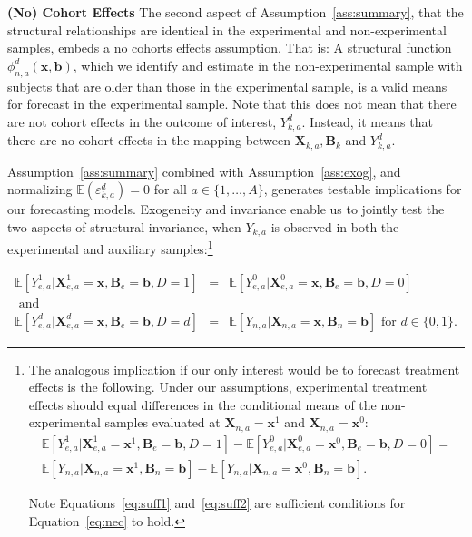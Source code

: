 \begin{remark} \label{remark:cohort} \textbf{(No) Cohort Effects}
The second aspect of Assumption~\ref{ass:summary}, that the structural relationships are identical in the experimental and non-experimental samples, embeds a no cohorts effects assumption. That is: A structural function $\phi_{n,a}^d \left( \bm{x}, \bm{b} \right)$, which we identify and estimate in the non-experimental sample with subjects that are older than those in the experimental sample, is a valid means for forecast in the experimental sample. Note that this does not mean that there are not cohort effects in the outcome of interest, $Y_{k,a}^d$. Instead, it means that there are no cohort effects in the mapping between $\bm{X}_{k,a}, \bm{B}_k$ and $Y_{k,a}^d$. 
\end{remark}
\doublespacing

Assumption~\ref{ass:summary} combined with Assumption~\ref{ass:exog}, and normalizing $\mathbb{E}(\varepsilon^d_{k,a})=0$ for all $a \in \{1,\dots,A\}$, generates testable implications for our forecasting models. Exogeneity and invariance enable us to jointly test the two aspects of structural invariance, when $Y_{k,a}$ is observed in both the experimental and auxiliary samples:\footnote{The analogous implication if our only interest would be to forecast treatment effects is the following. Under our assumptions, experimental treatment effects should equal differences in the conditional means of the non-experimental samples evaluated at $\bm{X}_{n,a} = \bm{x}^1$ and  $\bm{X}_{n,a} = \bm{x}^0$:
\begin{eqnarray}
\mathbb{E} \left[ Y_{e,a}^1 |  \bm{X}_{e,a}^1 = \bm{x}^1, \bm{B}_e = \bm{b}, D = 1 \right] - \mathbb{E} \left[ Y_{e,a}^0 |  \bm{X}_{e,a}^0 = \bm{x}^0, \bm{B}_e = \bm{b}, D = 0 \right] = \nonumber \\
\mathbb{E} \left[ Y_{n,a} | \bm{X}_{n,a} = \bm{x}^1, \bm{B}_n = \bm{b} \right] - \mathbb{E} \left[ Y_{n,a} | \bm{X}_{n,a} = \bm{x}^0, \bm{B}_n = \bm{b} \right]. \label{eq:nec}
\end{eqnarray}

Note Equations~\eqref{eq:suff1} and~\eqref{eq:suff2} are sufficient conditions for Equation~\eqref{eq:nec} to hold.}

\begin{eqnarray}
\mathbb{E} \left[ Y_{e,a}^1 | \bm{X}_{e,a}^1 = \bm{x}, \bm{B}_{e} = \bm{b}, D = 1   \right] &=&  \mathbb{E} \left[ Y_{e,a}^0 | \bm{X}_{e,a}^0 = \bm{x}, \bm{B}_{e} = \bm{b}, D = 0   \right] \label{eq:suff1}  \\
\text{ and} & \nonumber \\
\mathbb{E} \left[ Y_{e,a}^d | \bm{X}_{e,a}^d = \bm{x}, \bm{B}_{e} = \bm{b}, D = d   \right] &=&  \mathbb{E} \left[ Y_{n,a} | \bm{X}_{n,a} = \bm{x}, \bm{B}_{n} = \bm{b} \right] \text{ for }  d \in \{0,1\}. \label{eq:suff2}
\end{eqnarray}

